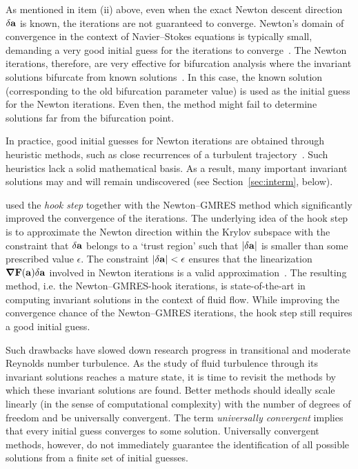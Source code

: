 \documentclass{jfm}
\begin{document}
As mentioned in item (ii) above, even when the exact Newton descent direction $\delta \mathbf a$
is known, the iterations are not guaranteed to converge. Newton's domain of convergence
in the context of Navier--Stokes equations is typically small,
demanding a very good initial guess for the iterations to converge~\citep{W97}. The Newton
iterations, therefore, are very effective
for bifurcation analysis where the invariant solutions bifurcate from known
solutions~\citep{Tuck00,W03,K12}. In this case, the known solution (corresponding to the
old bifurcation parameter value) is used as the initial guess for the Newton iterations.
Even then, the method might fail to determine solutions far from the bifurcation point.

In practice, good initial guesses for Newton iterations are obtained through heuristic methods,
such as close recurrences of a turbulent trajectory~\citep{pchaot,kawahara06,DV04,CviGib10}.
Such heuristics lack a
solid mathematical basis. As a result, many important invariant solutions may and will remain undiscovered
(see Section~\ref{sec:interm}, below).

\cite{DV04} used the \emph{hook step}
together with the Newton--GMRES
method which significantly improved the convergence of the iterations. The
underlying idea of the hook step is to
approximate the Newton direction within the Krylov subspace with the constraint that
$\delta \mathbf a$ belongs to a `trust region' such that
$|\delta \mathbf a|$ is smaller than some prescribed value $\epsilon$. The
constraint $|\delta\mathbf a|<\epsilon$ ensures that the linearization
$\mbox{\boldmath $\nabla$}\mathbf F(\mathbf a)\delta\mathbf a$ involved in Newton iterations is a valid approximation~\citep{DS}.
The resulting method, i.e. the Newton--GMRES-hook iterations, is state-of-the-art
in computing invariant solutions in the context of fluid flow.
While improving the convergence chance of
the Newton--GMRES iterations, the hook step still requires a good
initial guess.

Such drawbacks have slowed down research progress in transitional and moderate Reynolds
number turbulence.
As the study of fluid turbulence through its invariant solutions reaches a mature state, it is time
to revisit the methods by which these invariant solutions are found. 
Better methods should ideally scale linearly (in the sense of computational complexity) 
with the number of degrees of freedom and be
universally convergent. The term \emph{universally convergent} implies that every initial guess converges
to some solution. Universally convergent methods, however, do not immediately guarantee the
identification of all possible solutions from a finite set of initial guesses.
\end{document}
